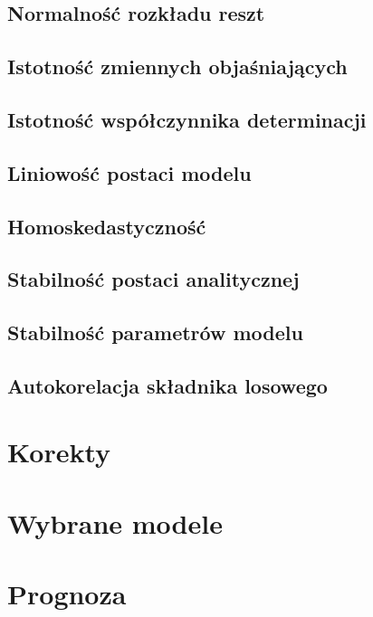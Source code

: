 \documentclass{article}
\begin{document}
\subsection{Normalność rozkładu reszt}

\subsection{Istotność zmiennych objaśniających}

\subsection{Istotność współczynnika determinacji}

\subsection{Liniowość postaci modelu}

\subsection{Homoskedastyczność}

\subsection{Stabilność postaci analitycznej}

\subsection{Stabilność parametrów modelu}

\subsection{Autokorelacja składnika losowego}

\section{Korekty}

\section{Wybrane modele}

\section{Prognoza}
\end{document}
